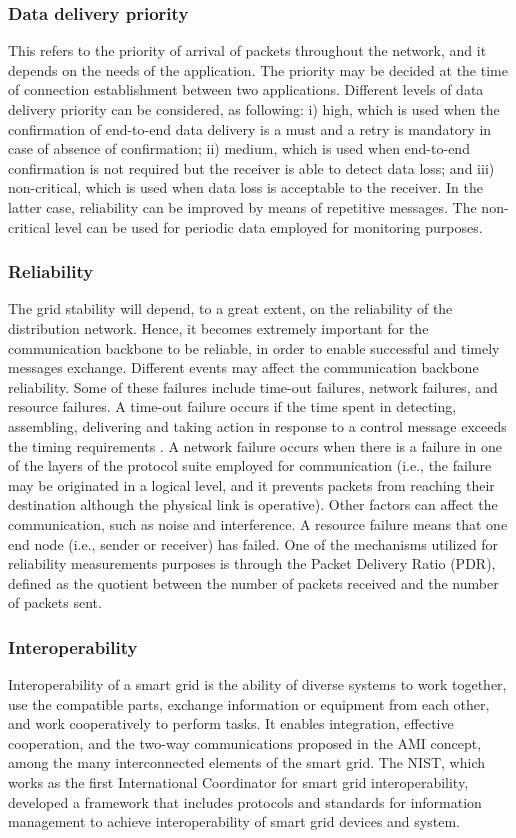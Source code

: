 \documentclass[11pt,draftclsnofoot,onecolumn]{IEEEtran}
\begin{document}
\subsubsection{Data delivery priority}
This refers to the priority of arrival of packets throughout the network, and it depends on the needs of the application. The priority may be decided at the time of connection establishment between two applications. Different levels of data delivery priority can be considered, as following: i) high, which is used when the confirmation of end-to-end data delivery is a must and a retry is mandatory in case of absence of confirmation; ii) medium, which is used when end-to-end confirmation is not required but the receiver is able to detect data loss; and iii) non-critical, which is used when data loss is acceptable to the receiver. In the latter case, reliability can be improved by means of repetitive messages. The non-critical level can be used for periodic data employed for monitoring purposes. 

\subsubsection{Reliability}
The grid stability will depend, to a great extent, on the reliability of the distribution network. Hence, it becomes extremely important for the communication backbone to be reliable, in order to enable successful and timely messages exchange. Different events may affect the communication backbone reliability. Some of these failures include time-out failures, network failures, and resource failures. A time-out failure occurs if the time spent in detecting, assembling, delivering and taking action in response to a control message exceeds the timing requirements \cite{Wang2011a}.  A network failure occurs when there is a failure in one of the layers of the protocol suite employed for communication (i.e., the failure may be originated in a logical level, and it prevents packets from reaching their destination although the physical link is operative). Other factors can affect the communication, such as noise and interference. A resource failure means that one end node (i.e., sender or receiver) has failed. One of the mechanisms utilized for reliability measurements purposes is through the Packet Delivery Ratio (PDR), defined as the quotient between the number of packets received and the number of packets sent.

\subsubsection{Interoperability}
Interoperability of a smart grid is the ability of diverse systems to work together, use the compatible parts, exchange information or equipment from each other, and work cooperatively to perform tasks. It enables integration, effective cooperation, and the two-way communications proposed in the AMI concept, among the many interconnected elements of the smart grid. The NIST, which works as the first International Coordinator for smart grid interoperability, developed a framework that includes protocols and standards for information management to achieve interoperability of smart grid devices and system.
\end{document}
